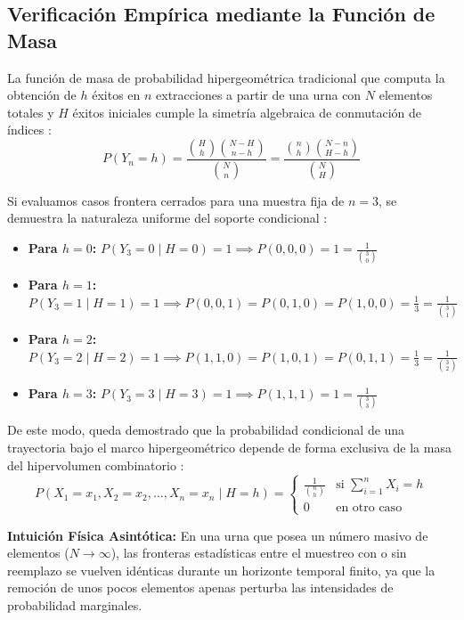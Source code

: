 \subsection*{Verificación Empírica mediante la Función de Masa}
La función de masa de probabilidad hipergeométrica tradicional que computa la obtención de $h$ éxitos en $n$ extracciones a partir de una urna con $N$ elementos totales y $H$ éxitos iniciales cumple la simetría algebraica de conmutación de índices :
\begin{equation*}
    P(Y_n = h) = \frac{\binom{H}{h} \binom{N-H}{n-h}}{\binom{N}{n}} = \frac{\binom{n}{h} \binom{N-n}{H-h}}{\binom{N}{H}}
\end{equation*}

Si evaluamos casos frontera cerrados para una muestra fija de $n=3$, se demuestra la naturaleza uniforme del soporte condicional :
\begin{itemize}
    \item \textbf{Para $h=0$:} $P(Y_3 = 0 \mid H = 0) = 1 \implies P(0,0,0) = 1 = \frac{1}{\binom{3}{0}}$
    \item \textbf{Para $h=1$:} $P(Y_3 = 1 \mid H = 1) = 1 \implies P(0,0,1) = P(0,1,0) = P(1,0,0) = \frac{1}{3} = \frac{1}{\binom{3}{1}}$
    \item \textbf{Para $h=2$:} $P(Y_3 = 2 \mid H = 2) = 1 \implies P(1,1,0) = P(1,0,1) = P(0,1,1) = \frac{1}{3} = \frac{1}{\binom{3}{2}}$
    \item \textbf{Para $h=3$:} $P(Y_3 = 3 \mid H = 3) = 1 \implies P(1,1,1) = 1 = \frac{1}{\binom{3}{3}}$
\end{itemize}

De este modo, queda demostrado que la probabilidad condicional de una trayectoria bajo el marco hipergeométrico depende de forma exclusiva de la masa del hipervolumen combinatorio :
\begin{equation*}
    P(X_1 = x_1, X_2 = x_2, \dots, X_n = x_n \mid H = h) = \begin{cases} \frac{1}{\binom{n}{h}} & \text{si } \sum_{i=1}^{n} X_i = h \\ 0 & \text{en otro caso} \end{cases}
\end{equation*}

\begin{small}
\textbf{Intuición Física Asintótica:} En una urna que posea un número masivo de elementos ($N \to \infty$), las fronteras estadísticas entre el muestreo con o sin reemplazo se vuelven idénticas durante un horizonte temporal finito, ya que la remoción de unos pocos elementos apenas perturba las intensidades de probabilidad marginales.
\end{small}

